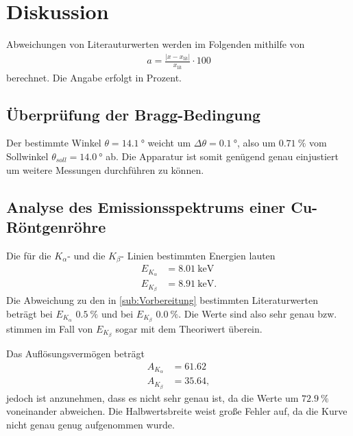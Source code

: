 \section{Diskussion}
\label{sec:Diskussion}

Abweichungen von Literauturwerten werden im Folgenden mithilfe von
\begin{align*}
    a=\frac{|x-x_{\text{lit}}|}{x_{\text{lit}}}\cdot 100 \label{eqn:abweich}
\end{align*}
berechnet. Die Angabe erfolgt in Prozent.

\subsection{Überprüfung der Bragg-Bedingung} %
\label{sub:Bragg_dis}
Der bestimmte Winkel $\theta=\qty{14.1}{\degree}$ weicht um $\Delta \theta =\qty{0.1}{\degree}$, also um $\qty{0.71}{\percent}$
vom Sollwinkel $\theta_{soll}=\qty{14.0}{\degree}$ ab.
Die Apparatur ist somit genügend genau einjustiert um weitere Messungen durchführen zu können.


\subsection{Analyse des Emissionsspektrums einer Cu-Röntgenröhre} %
\label{sub:Emission_dis}

Die für die $K_\alpha$- und die $K_\beta$- Linien bestimmten Energien lauten
\begin{align*}
    E_{K_\alpha}&= \qty{8.01}{\kilo\electronvolt}\\
    E_{K_\beta}&= \qty{8.91}{\kilo\electronvolt}.
\end{align*} 
Die Abweichung zu den in \autoref{sub:Vorbereitung} bestimmten Literaturwerten beträgt bei $E_{K_\alpha}$ $\qty{0.5}{\percent}$
und bei $E_{K_\beta}$ $\qty{0.0}{\percent}$. Die Werte sind also sehr genau bzw. stimmen im Fall von $E_{K_\beta}$ sogar mit dem
Theoriwert überein.

Das Auflösungsvermögen beträgt
\begin{align*}
    A_{K_\alpha} &= 61.62\\
    A_{K_\beta} &= 35.64,
\end{align*}
jedoch ist anzunehmen, dass es nicht sehr genau ist, da die Werte um $\qty{72.9}{\percent}$ voneinander abweichen.
Die Halbwertsbreite weist große Fehler auf, da die Kurve nicht genau genug aufgenommen wurde.

